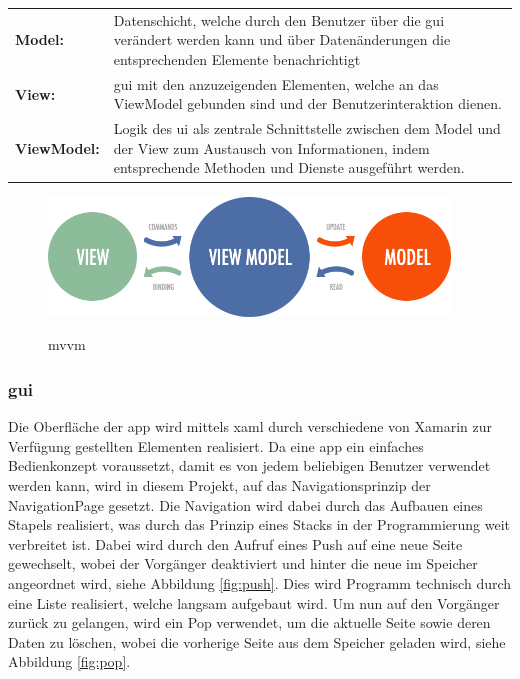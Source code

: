 \begin{tabular}{p{2.5cm} p{12.25cm}}
	\textbf{Model:} & Datenschicht, welche durch den Benutzer über die \gls{gui} verändert werden kann und über Datenänderungen die entsprechenden Elemente benachrichtigt \\
	\textbf{View:} & \gls{gui} mit den anzuzeigenden Elementen, welche an das ViewModel gebunden sind und der Benutzerinteraktion dienen. \\
	\textbf{ViewModel:} & Logik des \gls{ui} als zentrale Schnittstelle zwischen dem Model und der View zum Austausch von Informationen, indem entsprechende Methoden und Dienste ausgeführt werden. \\
\end{tabular}

\bigskip

\begin{figure}[h]
	\begin{center}
		\includegraphics[width=0.95\textwidth]{images/implementation/mvvm.png}
	\end{center}	
	\caption{\acrlong{mvvm}}
	\cite{Brecht.MVVMEntity}
	\label{fig:mvvm}
\end{figure}

\newpage
\subsubsection{\acrfull{gui}} %

Die Oberfläche der \gls{app} wird mittels \gls{xaml} durch verschiedene von Xamarin zur Verfügung gestellten Elementen realisiert. Da eine \gls{app} ein einfaches Bedienkonzept voraussetzt, damit es von jedem beliebigen Benutzer verwendet werden kann, wird in diesem Projekt, auf das Navigationsprinzip der NavigationPage gesetzt. Die Navigation wird dabei durch das Aufbauen eines Stapels realisiert, was durch das Prinzip eines Stacks in der Programmierung weit verbreitet ist. Dabei wird durch den Aufruf eines Push auf eine neue Seite gewechselt, wobei der Vorgänger deaktiviert und hinter die neue im Speicher angeordnet wird, siehe Abbildung \eqref{fig:push}. Dies wird Programm technisch durch eine Liste realisiert, welche langsam aufgebaut wird. Um nun auf den Vorgänger zurück zu gelangen, wird ein Pop verwendet, um die aktuelle Seite sowie deren Daten zu löschen, wobei die vorherige Seite aus dem Speicher geladen wird, siehe Abbildung \eqref{fig:pop}.\\

